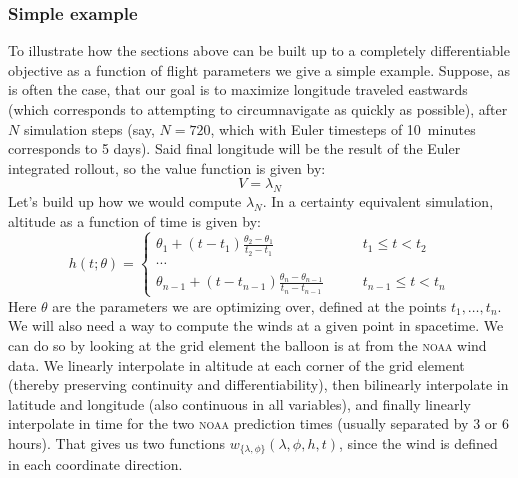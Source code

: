 \documentclass[11pt]{scrartcl} %
\begin{document}
\subsubsection{Simple example}
To illustrate how the sections above can be built up to a completely differentiable objective as a function of flight parameters we give a simple example. Suppose, as is often the case, that our goal is to maximize longitude traveled eastwards (which corresponds to attempting to circumnavigate as quickly as possible), after $N$ simulation steps (say, $N=720$, which with Euler timesteps of 10~minutes corresponds to 5 days). Said final longitude will be the result of the Euler integrated rollout, so the value function is given by:
\[V = \lambda_N\]
Let's build up how we would compute $\lambda_N$. In a certainty equivalent simulation, altitude as a function of time is given by:
\[h(t; \theta) = \begin{cases}
\theta_1 + (t-t_1)\frac{\theta_2-\theta_1}{t_2-t_1} \qquad & t_1 \leq t < t_2\\
\cdots\\
\theta_{n-1} + (t-t_{n-1})\frac{\theta_n-\theta_{n-1}}{t_n-t_{n-1}} \qquad & t_{n-1} \leq t < t_n
\end{cases}\]
Here $\theta$ are the parameters we are optimizing over, defined at the points $t_1,\dots,t_n$. We will also need a way to compute the winds at a given point in spacetime. We can do so by looking at the grid element the balloon is at from the \textsc{noaa} wind data. We linearly interpolate in altitude at each corner of the grid element (thereby preserving continuity and differentiability), then bilinearly interpolate in latitude and longitude (also continuous in all variables), and finally linearly interpolate in time for the two \textsc{noaa} prediction times (usually separated by 3 or 6 hours). That gives us two functions $w_{\{\lambda,\phi\}}(\lambda,\phi,h,t)$, since the wind is defined in each coordinate direction.
\end{document}
